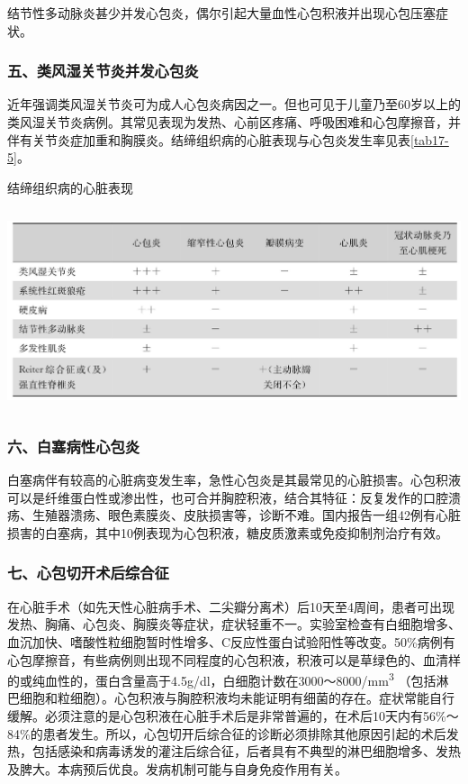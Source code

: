 结节性多动脉炎甚少并发心包炎，偶尔引起大量血性心包积液并出现心包压塞症状。

\subsubsection{五、类风湿关节炎并发心包炎}

近年强调类风湿关节炎可为成人心包炎病因之一。但也可见于儿童乃至60岁以上的类风湿关节炎病例。其常见表现为发热、心前区疼痛、呼吸困难和心包摩擦音，并伴有关节炎症加重和胸膜炎。结缔组织病的心脏表现与心包炎发生率见表\ref{tab17-5}。

\begin{table}[htbp]
\centering
\caption{结缔组织病的心脏表现}
\label{tab17-5}
\includegraphics[width=5.9375in,height=2.33333in]{./images/Image00110.jpg}
\end{table}

\subsubsection{六、白塞病性心包炎}

白塞病伴有较高的心脏病变发生率，急性心包炎是其最常见的心脏损害。心包积液可以是纤维蛋白性或渗出性，也可合并胸腔积液，结合其特征：反复发作的口腔溃疡、生殖器溃疡、眼色素膜炎、皮肤损害等，诊断不难。国内报告一组42例有心脏损害的白塞病，其中10例表现为心包积液，糖皮质激素或免疫抑制剂治疗有效。

\subsubsection{七、心包切开术后综合征}

在心脏手术（如先天性心脏病手术、二尖瓣分离术）后10天至4周间，患者可出现发热、胸痛、心包炎、胸膜炎等症状，症状轻重不一。实验室检查有白细胞增多、血沉加快、嗜酸性粒细胞暂时性增多、C反应性蛋白试验阳性等改变。50\%病例有心包摩擦音，有些病例则出现不同程度的心包积液，积液可以是草绿色的、血清样的或纯血性的，蛋白含量高于4.5g/dl，白细胞计数在3000～8000/mm\textsuperscript{3}
（包括淋巴细胞和粒细胞）。心包积液与胸腔积液均未能证明有细菌的存在。症状常能自行缓解。必须注意的是心包积液在心脏手术后是非常普遍的，在术后10天内有56\%～84\%的患者发生。所以，心包切开后综合征的诊断必须排除其他原因引起的术后发热，包括感染和病毒诱发的灌注后综合征，后者具有不典型的淋巴细胞增多、发热及脾大。本病预后优良。发病机制可能与自身免疫作用有关。

